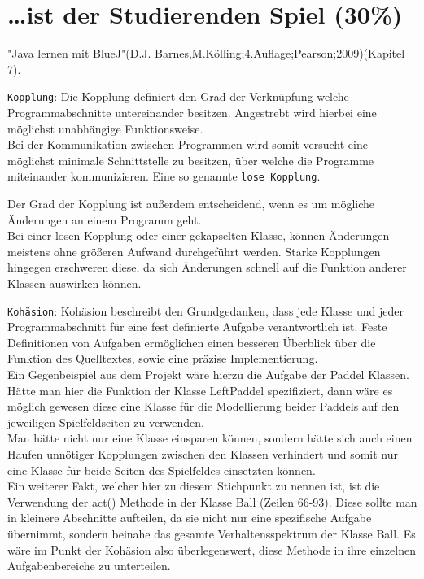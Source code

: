 \documentclass{pi1}
\begin{document}
\section{\ldots ist der Studierenden Spiel (30\%)}
"Java lernen mit BlueJ"(D.J. Barnes,M.Kölling;4.Auflage;Pearson;2009)(Kapitel 7).

\texttt{Kopplung}:
Die Kopplung definiert den Grad der Verknüpfung welche Programmabschnitte untereinander besitzen. Angestrebt wird hierbei eine möglichst unabhängige Funktionsweise.\\
Bei der Kommunikation zwischen Programmen wird somit versucht eine möglichst minimale Schnittstelle zu besitzen, über welche die Programme miteinander kommunizieren.
Eine so genannte \texttt{lose Kopplung}.\newline

Der Grad der Kopplung ist außerdem entscheidend, wenn es um mögliche Änderungen an einem Programm geht.\\
Bei einer losen Kopplung oder einer gekapselten Klasse, können Änderungen meistens ohne größeren Aufwand durchgeführt werden.
Starke Kopplungen hingegen erschweren diese, da sich Änderungen schnell auf die Funktion anderer Klassen auswirken können.\newline

\texttt{Kohäsion}:
Kohäsion beschreibt  den Grundgedanken, dass jede Klasse und jeder Programmabschnitt für eine fest definierte Aufgabe verantwortlich ist. Feste Definitionen von Aufgaben ermöglichen einen besseren Überblick über die Funktion des Quelltextes, sowie eine präzise Implementierung.\\
Ein Gegenbeispiel aus dem Projekt wäre hierzu die Aufgabe der Paddel Klassen.
Hätte man hier die Funktion der Klasse LeftPaddel spezifiziert, dann wäre es möglich gewesen diese eine Klasse für die Modellierung beider Paddels auf den jeweiligen Spielfeldseiten zu verwenden.\\
Man hätte nicht nur eine Klasse einsparen können, sondern hätte sich auch einen Haufen unnötiger Kopplungen zwischen den Klassen verhindert und somit nur eine Klasse für beide Seiten des Spielfeldes einsetzten können.\\
Ein weiterer Fakt, welcher hier zu diesem Stichpunkt zu nennen ist, ist die Verwendung der act() Methode in der Klasse Ball (Zeilen 66-93). Diese sollte man in kleinere Abschnitte aufteilen, da sie nicht nur eine spezifische Aufgabe übernimmt, sondern beinahe das gesamte Verhaltensspektrum der Klasse Ball. Es wäre im Punkt der Kohäsion also überlegenswert, diese Methode in ihre einzelnen Aufgabenbereiche zu unterteilen.
\end{document}
